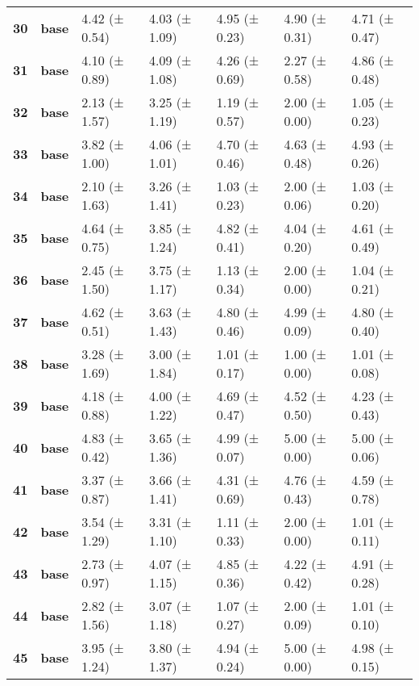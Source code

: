 \begin{longtable}{lllllll}
\cline{1-7}
\textbf{30} & \textbf{base} & 4.42 (± 0.54) & 4.03 (± 1.09) & 4.95 (± 0.23) & 4.90 (± 0.31) & 4.71 (± 0.47) \\
\cline{1-7}
\textbf{31} & \textbf{base} & 4.10 (± 0.89) & 4.09 (± 1.08) & 4.26 (± 0.69) & 2.27 (± 0.58) & 4.86 (± 0.48) \\
\cline{1-7}
\textbf{32} & \textbf{base} & 2.13 (± 1.57) & 3.25 (± 1.19) & 1.19 (± 0.57) & 2.00 (± 0.00) & 1.05 (± 0.23) \\
\cline{1-7}
\textbf{33} & \textbf{base} & 3.82 (± 1.00) & 4.06 (± 1.01) & 4.70 (± 0.46) & 4.63 (± 0.48) & 4.93 (± 0.26) \\
\cline{1-7}
\textbf{34} & \textbf{base} & 2.10 (± 1.63) & 3.26 (± 1.41) & 1.03 (± 0.23) & 2.00 (± 0.06) & 1.03 (± 0.20) \\
\cline{1-7}
\textbf{35} & \textbf{base} & 4.64 (± 0.75) & 3.85 (± 1.24) & 4.82 (± 0.41) & 4.04 (± 0.20) & 4.61 (± 0.49) \\
\cline{1-7}
\textbf{36} & \textbf{base} & 2.45 (± 1.50) & 3.75 (± 1.17) & 1.13 (± 0.34) & 2.00 (± 0.00) & 1.04 (± 0.21) \\
\cline{1-7}
\textbf{37} & \textbf{base} & 4.62 (± 0.51) & 3.63 (± 1.43) & 4.80 (± 0.46) & 4.99 (± 0.09) & 4.80 (± 0.40) \\
\cline{1-7}
\textbf{38} & \textbf{base} & 3.28 (± 1.69) & 3.00 (± 1.84) & 1.01 (± 0.17) & 1.00 (± 0.00) & 1.01 (± 0.08) \\
\cline{1-7}
\textbf{39} & \textbf{base} & 4.18 (± 0.88) & 4.00 (± 1.22) & 4.69 (± 0.47) & 4.52 (± 0.50) & 4.23 (± 0.43) \\
\cline{1-7}
\textbf{40} & \textbf{base} & 4.83 (± 0.42) & 3.65 (± 1.36) & 4.99 (± 0.07) & 5.00 (± 0.00) & 5.00 (± 0.06) \\
\cline{1-7}
\textbf{41} & \textbf{base} & 3.37 (± 0.87) & 3.66 (± 1.41) & 4.31 (± 0.69) & 4.76 (± 0.43) & 4.59 (± 0.78) \\
\cline{1-7}
\textbf{42} & \textbf{base} & 3.54 (± 1.29) & 3.31 (± 1.10) & 1.11 (± 0.33) & 2.00 (± 0.00) & 1.01 (± 0.11) \\
\cline{1-7}
\textbf{43} & \textbf{base} & 2.73 (± 0.97) & 4.07 (± 1.15) & 4.85 (± 0.36) & 4.22 (± 0.42) & 4.91 (± 0.28) \\
\cline{1-7}
\textbf{44} & \textbf{base} & 2.82 (± 1.56) & 3.07 (± 1.18) & 1.07 (± 0.27) & 2.00 (± 0.09) & 1.01 (± 0.10) \\
\cline{1-7}
\textbf{45} & \textbf{base} & 3.95 (± 1.24) & 3.80 (± 1.37) & 4.94 (± 0.24) & 5.00 (± 0.00) & 4.98 (± 0.15) \\

\end{longtable}
